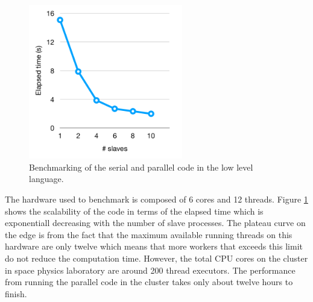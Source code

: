 \begin{figure}[h]
    \centering
    \includegraphics[width=0.6\textwidth]{appendix/exposure/ms_perf.png}
    \caption{
        Benchmarking of the serial and parallel code
        in the low level language.
    }
    \label{fig:parallel_benchmark}
\end{figure}

The hardware used to benchmark is composed of 6 cores and 
12 threads. Figure \ref{fig:parallel_benchmark} shows the 
scalability of the code
in terms of the elapsed time which is exponentiall decreasing with
the number of slave processes.
The plateau curve on the edge is from the fact that
the maximum available running threads on this hardware
are only twelve which means that more workers that 
exceeds this limit do not reduce the computation time.
However, the total CPU cores on the cluster in space
physics laboratory are around 200 thread executors.
The performance from running the parallel code in the cluster 
takes only about twelve hours to finish.


